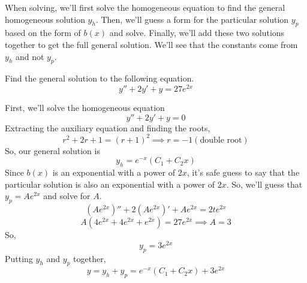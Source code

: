 \noindent
When solving, we'll first solve the homogeneous equation to find the general homogeneous solution $y_h$. Then, we'll guess a form for the particular solution $y_p$ based on the form of $b(x)$ and solve. Finally, we'll add these two solutions together to get the full general solution. We'll see that the constants come from $y_h$ and not $y_p$.

\begin{example}
	Find the general solution to the following equation.
	\begin{equation*}
		y'' + 2y' + y = 27e^{2x}
	\end{equation*}
\end{example}
\noindent
First, we'll solve the homogeneous equation
\begin{equation*}
	y'' + 2y' + y = 0
\end{equation*}
Extracting the auxiliary equation and finding the roots,
\begin{equation*}
	r^2 + 2r + 1 = \left(r+1\right)^2 \implies r = -1 \left(\text{double root}\right)
\end{equation*}
So, our general solution is
\begin{equation*}
	y_h = e^{-x}\left(C_1 + C_2x\right)
\end{equation*}
Since $b(x)$ is an exponential with a power of $2x$, it's safe guess to say that the particular solution is also an exponential with a power of $2x$. So, we'll guess that $y_p = Ae^{2x}$ and solve for $A$.
\begin{equation*}
	\left(Ae^{2x}\right)'' + 2\left(Ae^{2x}\right)' + Ae^{2x} = 2te^{2x}
\end{equation*}
\begin{equation*}
	A\left(4e^{2x} + 4e^{2x} + e^{2x}\right) = 27e^{2x} \implies A = 3
\end{equation*}
So,
\begin{equation*}
	y_p = 3e^{2x}
\end{equation*}
Putting $y_h$ and $y_p$ together,
\begin{equation*}
	y = y_h + y_p = e^{-x}\left(C_1 + C_2x\right) + 3e^{2x}
\end{equation*}


